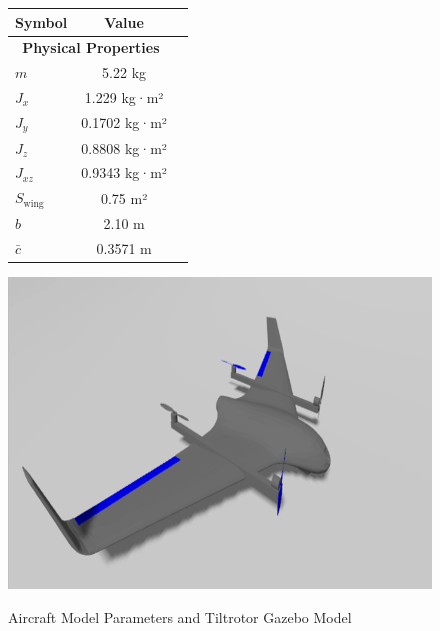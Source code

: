 \documentclass[journal,article,submit,pdftex,moreauthors]{Definitions/mdpi}
\begin{document}

\begin{figure}[H]
    \centering
    \begin{minipage}{0.45\linewidth}
        \centering
        \begin{tabular}{|l|c|c|}
            \hline
            \textbf{Symbol} & \textbf{Value} \\ \hline
            \multicolumn{2}{|c|}{\textbf{Physical Properties}} \\ \hline
            \( m \) & 5.22 kg \\ \hline
            \( J_x \) & 1.229 kg·m² \\ \hline
            \( J_y \) & 0.1702 kg·m² \\ \hline
            \( J_z \) & 0.8808 kg·m² \\ \hline
            \( J_{xz} \) & 0.9343 kg·m² \\ \hline
            \( S_{\text{wing}} \) & 0.75 m² \\ \hline
            \( b \) & 2.10 m \\ \hline
            \( \bar{c} \) & 0.3571 m \\ \hline
        \end{tabular}
        \label{tab:aircraft_model_parameters}
    \end{minipage}
    \hfill %
    \begin{minipage}{0.45\linewidth}
        \centering
        \includegraphics[width=\linewidth]{tiltrotor_gazebo.png}
        \label{fig:tiltrotor_gazebo}
    \end{minipage}
    \caption{Aircraft Model Parameters and Tiltrotor Gazebo Model}
    \label{fig:aircraft_model_parameters_and_gazebo}
\end{figure}
\end{document}

